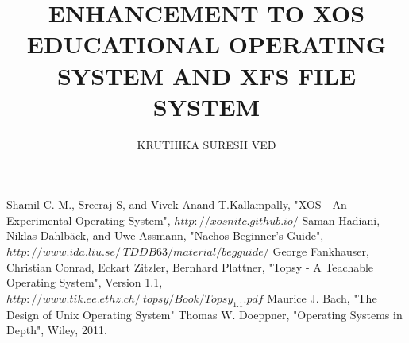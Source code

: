 \documentclass[modernstyle,12pt]{thesis}
\title{\uppercase{Enhancement to XOS Educational Operating System and XFS file system}}
\author{\uppercase{KRUTHIKA SURESH VED}} {\uppercase{B110300CS}} {\uppercase{SIKHA V MANOJ}} {\uppercase{B110572CS}} {\uppercase{SONIA V MATHEW}} {\uppercase{B110495CS}}
\begin{document}














\nocite{*}      %


\begin{thebibliography}{30}
Shamil C. M., Sreeraj S, and Vivek Anand T.Kallampally, "XOS - An Experimental Operating System", \texttt{$http://xosnitc.github.io/$}
Saman Hadiani, Niklas Dahlbäck, and Uwe Assmann, "Nachos Beginner's Guide", \texttt{$http://www.ida.liu.se/~TDDB63/material/begguide/$}
George Fankhauser, Christian Conrad, Eckart Zitzler, Bernhard Plattner, "Topsy - A Teachable Operating System", Version 1.1, \texttt{$http://www.tik.ee.ethz.ch/~topsy/Book/Topsy_1.1.pdf$}
Maurice J. Bach, "The Design of Unix Operating System"
Thomas W. Doeppner, "Operating Systems in Depth", Wiley, 2011.  
\end{thebibliography}


\appendix   %


\end{document}
